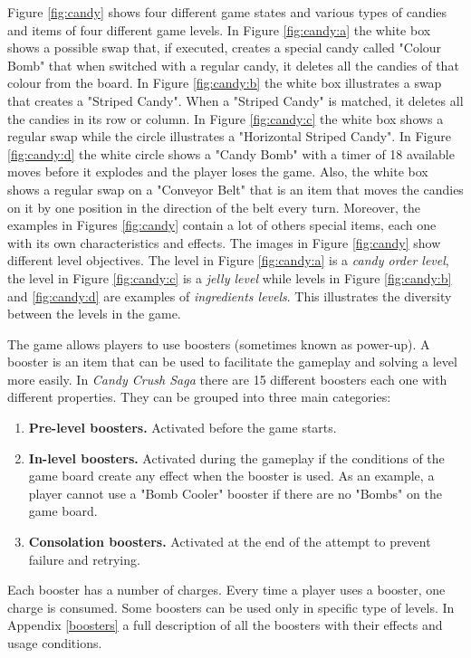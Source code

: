 Figure \ref{fig:candy} shows four different game states and various types of candies and items of four different game levels.  In Figure \ref{fig:candy:a} the white box shows a possible swap that, if executed, creates a special candy called "Colour Bomb" that when switched with a regular candy, it deletes all the candies of that colour from the board. In Figure \ref{fig:candy:b} the white box illustrates a swap that creates a "Striped Candy". When a "Striped Candy" is matched, it deletes all the candies in its row or column. In Figure \ref{fig:candy:c} the white box shows a regular swap while the circle illustrates a "Horizontal Striped Candy". In Figure \ref{fig:candy:d} the white circle shows a "Candy Bomb" with a timer of 18 available moves before it explodes and the player loses the game. Also, the white box shows a regular swap on a "Conveyor Belt" that is an item that moves the candies on it by one position in the direction of the belt every turn. Moreover, the examples in Figures \ref{fig:candy} contain a lot of others special items, each one with its own characteristics and effects. The images in Figure \ref{fig:candy} show different level objectives. The level in Figure \ref{fig:candy:a} is a \textit{candy order level}, the level in Figure \ref{fig:candy:c} is a \textit{jelly level} while levels in Figure \ref{fig:candy:b} and \ref{fig:candy:d} are examples of \textit{ingredients levels}. This illustrates the diversity between the levels in the game.

The game allows players to use boosters (sometimes known as power-up). A booster is an item that can be used to facilitate the gameplay and solving a level more easily. In \textit{Candy Crush Saga} there are 15 different boosters each one with different properties. They can be grouped into three main categories:
\begin{enumerate}
    \item \textbf{Pre-level boosters.} Activated before the game starts.
    \item \textbf{In-level boosters.} Activated during the gameplay if the conditions of the game board create any effect when the booster is used. As an example, a player cannot use a "Bomb Cooler" booster if there are no "Bombs" on the game board.
    \item \textbf{Consolation boosters.} Activated at the end of the attempt to prevent failure and retrying.
\end{enumerate}
Each booster has a number of charges. Every time a player uses a booster, one charge is consumed. Some boosters can be used only in specific type of levels. In Appendix \ref{boosters} a full description of all the boosters with their effects and usage conditions.


